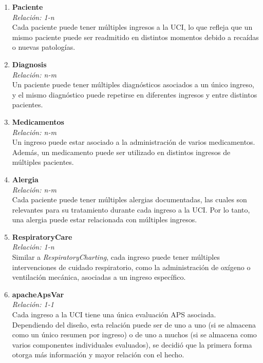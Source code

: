 \documentclass[12pt, a4paper, twoside]{article}
\begin{document}
	\begin{enumerate}
		\item \textbf{Paciente} \\
		\textit{Relación: 1-n} \\
		Cada paciente puede tener múltiples ingresos a la UCI, lo que refleja que un mismo paciente puede ser readmitido en distintos momentos debido a recaídas o nuevas patologías.
		
		\item \textbf{Diagnosis} \\
		\textit{Relación: n-m} \\
		Un paciente puede tener múltiples diagnósticos asociados a un único ingreso, y el mismo diagnóstico puede repetirse en diferentes ingresos y entre distintos pacientes.
		
		\item \textbf{Medicamentos} \\
		\textit{Relación: n-m} \\
		Un ingreso puede estar asociado a la administración de varios medicamentos. Además, un medicamento puede ser utilizado en distintos ingresos de múltiples pacientes.
		
		\item \textbf{Alergia} \\
		\textit{Relación: n-m} \\
		Cada paciente puede tener múltiples alergias documentadas, las cuales son relevantes para su tratamiento durante cada ingreso a la UCI. Por lo tanto, una alergia puede estar relacionada con múltiples ingresos.
		
		\item \textbf{RespiratoryCare} \\
		\textit{Relación: 1-n} \\
		Similar a \textit{RespiratoryCharting}, cada ingreso puede tener múltiples intervenciones de cuidado respiratorio, como la administración de oxígeno o ventilación mecánica, asociadas a un ingreso específico.
		
		\item \textbf{apacheApsVar} \\
		\textit{Relación: 1-1} \\
		Cada ingreso a la UCI tiene una única evaluación APS asociada. Dependiendo del diseño, esta relación puede ser de uno a uno (si se almacena como un único resumen por ingreso) o de uno a muchos (si se almacena como varios componentes individuales evaluados), se decidió que la primera forma otorga más información y mayor relación con el hecho.
		

\end{enumerate}
\end{document}
